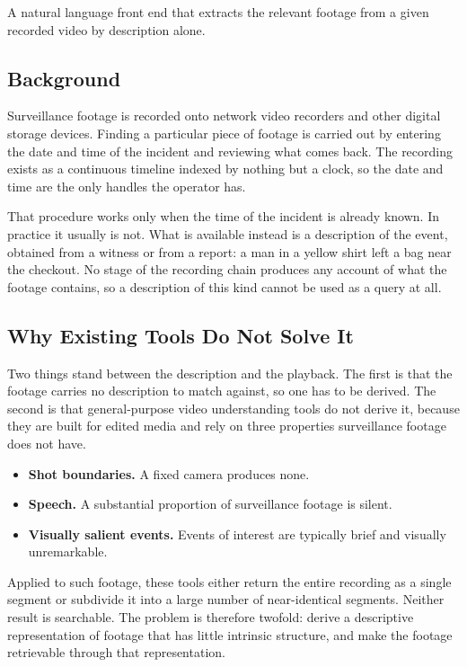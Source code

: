 \documentclass[11pt,a4paper]{article}
\begin{document}
A natural language front end that extracts the relevant footage from a given
recorded video by description alone.

\subsection{Background}

Surveillance footage is recorded onto network video recorders and other digital
storage devices. Finding a particular piece of footage is carried out by
entering the date and time of the incident and reviewing what comes back. The
recording exists as a continuous timeline indexed by nothing but a clock, so the
date and time are the only handles the operator has.

That procedure works only when the time of the incident is already known. In
practice it usually is not. What is available instead is a description of the
event, obtained from a witness or from a report: a man in a yellow shirt left a
bag near the checkout. No stage of the recording chain produces any account of
what the footage contains, so a description of this kind cannot be used as a
query at all.

\subsection{Why Existing Tools Do Not Solve It}

Two things stand between the description and the playback. The first is that the
footage carries no description to match against, so one has to be derived. The
second is that general-purpose video understanding tools do not derive it,
because they are built for edited media and rely on three properties
surveillance footage does not have.

\begin{itemize}
  \item \textbf{Shot boundaries.} A fixed camera produces none.
  \item \textbf{Speech.} A substantial proportion of surveillance footage is
        silent.
  \item \textbf{Visually salient events.} Events of interest are typically brief
        and visually unremarkable.
\end{itemize}

Applied to such footage, these tools either return the entire recording as a
single segment or subdivide it into a large number of near-identical segments.
Neither result is searchable. The problem is therefore twofold: derive a
descriptive representation of footage that has little intrinsic structure, and
make the footage retrievable through that representation.
\end{document}
